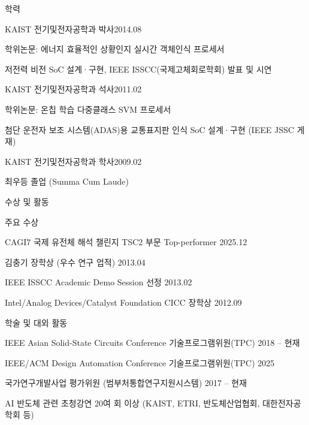 \documentclass{resume-ko} %
\begin{document}

\begin{section}{학력}

\begin{subsection}{KAIST 전기및전자공학과 박사}{2014.08}{}{}
\item 학위논문: 에너지 효율적인 상황인지 실시간 객체인식 프로세서
\item 저전력 비전 SoC 설계·구현, IEEE ISSCC(국제고체회로학회) 발표 및 시연
\end{subsection}

\begin{subsection}{KAIST 전기및전자공학과 석사}{2011.02}{}{}
\item 학위논문: 온칩 학습 다중클래스 SVM 프로세서
\item 첨단 운전자 보조 시스템(ADAS)용 교통표지판 인식 SoC 설계·구현 (IEEE JSSC 게재)
\end{subsection}

\begin{subsection}{KAIST 전기및전자공학과 학사}{2009.02}{}{}
\item 최우등 졸업 (Summa Cum Laude)
\end{subsection}

\end{section}


\begin{section}{수상 및 활동}

\begin{subsection}{주요 수상}{}{}{}
\item CAGI7 국제 유전체 해석 챌린지 TSC2 부문 Top-performer \hfill 2025.12
\item 김충기 장학상 (우수 연구 업적) \hfill 2013.04
\item IEEE ISSCC Academic Demo Session 선정 \hfill 2013.02
\item Intel/Analog Devices/Catalyst Foundation CICC 장학상 \hfill 2012.09
\end{subsection}

\begin{subsection}{학술 및 대외 활동}{}{}{}
\item IEEE Asian Solid-State Circuits Conference 기술프로그램위원(TPC) \hfill 2018 -- 현재
\item IEEE/ACM Design Automation Conference 기술프로그램위원(TPC) \hfill 2025
\item 국가연구개발사업 평가위원 (범부처통합연구지원시스템) \hfill 2017 -- 현재
\item AI 반도체 관련 초청강연 20여 회 이상 (KAIST, ETRI, 반도체산업협회, 대한전자공학회 등)
\end{subsection}

\end{section}
\end{document}
